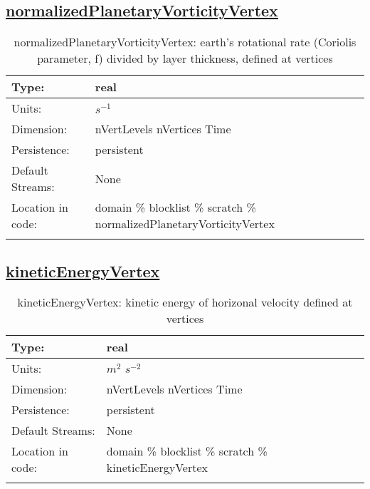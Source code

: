 \subsection[normalizedPlanetaryVorticityVertex]{\hyperref[sec:var_tab_scratch]{normalizedPlanetaryVorticityVertex}}
\label{subsec:var_sec_scratch_normalizedPlanetaryVorticityVertex}
\begin{center}
\begin{longtable}{| p{2.0in} | p{4.0in} |}
        \hline 
        Type: & real \\
        \hline 
        Units: & $s^{-1}$ \\
        \hline 
        Dimension: & nVertLevels nVertices Time \\
        \hline 
        Persistence: & persistent \\
        \hline 
		 Default Streams: & None \\
        \hline 
		 Location in code: & domain \% blocklist \% scratch \% normalizedPlanetaryVorticityVertex \\
		 \hline 
    \caption{normalizedPlanetaryVorticityVertex: earth's rotational rate (Coriolis parameter, f) divided by layer thickness, defined at vertices}
\end{longtable}
\end{center}
\subsection[kineticEnergyVertex]{\hyperref[sec:var_tab_scratch]{kineticEnergyVertex}}
\label{subsec:var_sec_scratch_kineticEnergyVertex}
\begin{center}
\begin{longtable}{| p{2.0in} | p{4.0in} |}
        \hline 
        Type: & real \\
        \hline 
        Units: & $m^2$ $s^{-2}$ \\
        \hline 
        Dimension: & nVertLevels nVertices Time \\
        \hline 
        Persistence: & persistent \\
        \hline 
		 Default Streams: & None \\
        \hline 
		 Location in code: & domain \% blocklist \% scratch \% kineticEnergyVertex \\
		 \hline 
    \caption{kineticEnergyVertex: kinetic energy of horizonal velocity defined at vertices}
\end{longtable}
\end{center}
